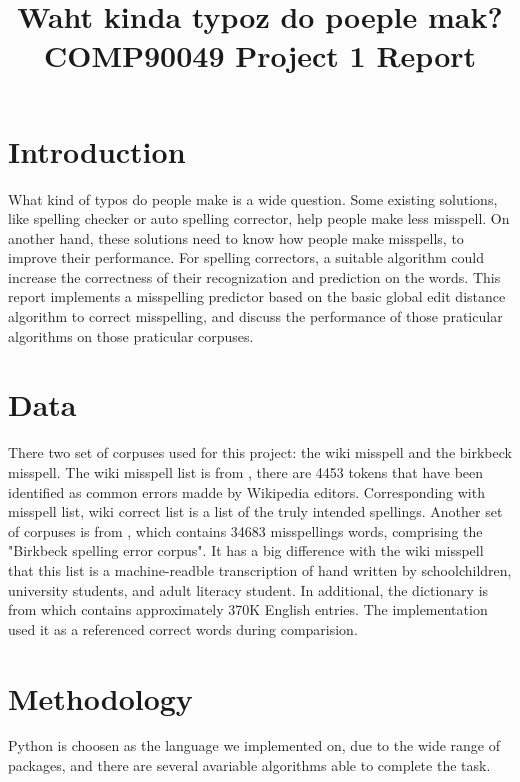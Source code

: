 \documentclass[11pt]{article}
\title{Waht kinda typoz do poeple mak?\\
	\large COMP90049 Project 1 Report}
\begin{document}
\maketitle

\section{Introduction}
What kind of typos do people make is a wide question. Some existing solutions, like spelling checker or auto spelling corrector, help people make less misspell. On another hand, these solutions need to know how people make misspells, to improve their performance. For spelling correctors, a suitable algorithm could increase the correctness of their recognization and prediction on the words. This report implements a misspelling predictor based on the basic global edit distance algorithm to correct misspelling, and discuss the performance of those praticular algorithms on those praticular corpuses.


\section{Data}
There two set of corpuses used for this project: the wiki misspell and the birkbeck misspell. The wiki misspell list is from , there are 4453 tokens that have been identified as common errors madde by Wikipedia editors. Corresponding with misspell list,  wiki correct list is a list of the truly intended spellings. Another set of corpuses is from , which contains 34683 misspellings words, comprising the "Birkbeck spelling error corpus". It has a big difference with the wiki misspell that this list is a machine-readble transcription of hand written by schoolchildren, university students, and adult literacy student. In additional, the dictionary is from \cite{EnglishWords} which contains approximately 370K English entries. The implementation used it as a referenced correct words during comparision.

\section{Methodology}
Python is choosen as the language we implemented on, due to the wide range of packages, and there are several avariable algorithms able to complete the task. 
\end{document}
